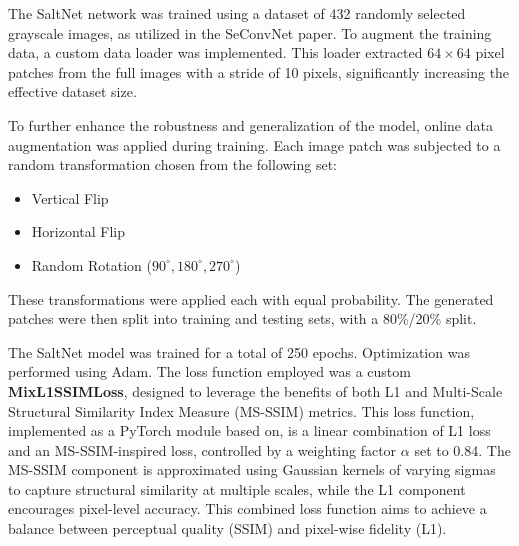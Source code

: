 The SaltNet network was trained using a dataset of 432 randomly selected grayscale images, as utilized in the SeConvNet paper\cite{Rafiee2021}. To augment the training data, a custom data loader was implemented. This loader extracted $64 \times 64$ pixel patches from the full images with a stride of 10 pixels, significantly increasing the effective dataset size.

To further enhance the robustness and generalization of the model, online data augmentation was applied during training. Each image patch was subjected to a random transformation chosen from the following set:

\begin{itemize}
    \item Vertical Flip
    \item Horizontal Flip
    \item Random Rotation ($90^\circ, 180^\circ, 270^\circ$)
\end{itemize}

These transformations were applied each with equal probability. The generated patches were then split into training and testing sets, with a 80\%/20\% split.

The SaltNet model was trained for a total of 250 epochs. Optimization was performed using Adam.  The loss function employed was a custom \textbf{MixL1SSIMLoss}, designed to leverage the benefits of both L1 and Multi-Scale Structural Similarity Index Measure (MS-SSIM) metrics\cite{Zhao2017}. This loss function, implemented as a PyTorch module based on\cite{Pessoa2023}, is a linear combination of L1 loss and an MS-SSIM-inspired loss, controlled by a weighting factor $\alpha$ set to 0.84. The MS-SSIM component is approximated using Gaussian kernels of varying sigmas to capture structural similarity at multiple scales, while the L1 component encourages pixel-level accuracy.  This combined loss function aims to achieve a balance between perceptual quality (SSIM) and pixel-wise fidelity (L1).

